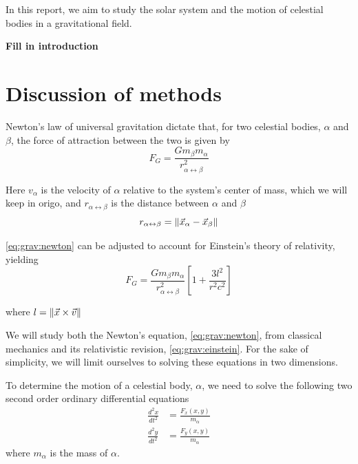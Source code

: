 \documentclass[a4paper]{article}
\begin{document}
In this report, we aim to study the solar system and the motion of celestial bodies in a gravitational field.



\textbf{Fill in introduction}




\section{Discussion of methods}\label{sec:methods}
Newton's law of universal gravitation dictate that, for two celestial bodies, $\alpha$ and $\beta$, the force of attraction between the two is given by
\begin{equation}
F_G
=\frac{Gm_{\beta}m_{\alpha}}{r_{\alpha \leftrightarrow \beta}^2}
\label{eq:grav:newton}
\end{equation}


Here $v_{\alpha}$ is the velocity of $\alpha$ relative to the system's center of mass, which we will keep in origo, and $r_{\alpha \leftrightarrow \beta}$ is the distance between $\alpha$ and $\beta$
\begin{equation}
r_{\alpha \leftrightarrow \beta} = \norm{ \vec{x}_{\alpha} - \vec{x}_{\beta} }
\end{equation}

\eqref{eq:grav:newton} can be adjusted to account for Einstein's theory of relativity, yielding
\begin{equation}
F_G
=\frac{Gm_{\beta}m_{\alpha}}{r_{\alpha \leftrightarrow \beta}^2}
\left[1 + \frac{3l^2}{r^2c^2}\right]
\label{eq:grav:einstein}
\end{equation}

where $l = \norm{\vec{x} \times \vec{v}}$

We will study both the Newton's equation, \eqref{eq:grav:newton}, from classical mechanics and its relativistic revision, \eqref{eq:grav:einstein}. For the sake of simplicity, we will limit ourselves to solving these equations in two dimensions.



To determine the motion of a celestial body, $\alpha$, we need to solve the following two second order ordinary differential equations
\begin{align}
\frac{d^2x}{dt^2} &= \frac{F_x(x,y)}{m_{\alpha}} \label{eq:acc:x}\\
\frac{d^2y}{dt^2} &= \frac{F_y(x,y)}{m_{\alpha}} \label{eq:acc:y}
\end{align}
where $m_{\alpha}$ is the mass of $\alpha$.\\
\end{document}
